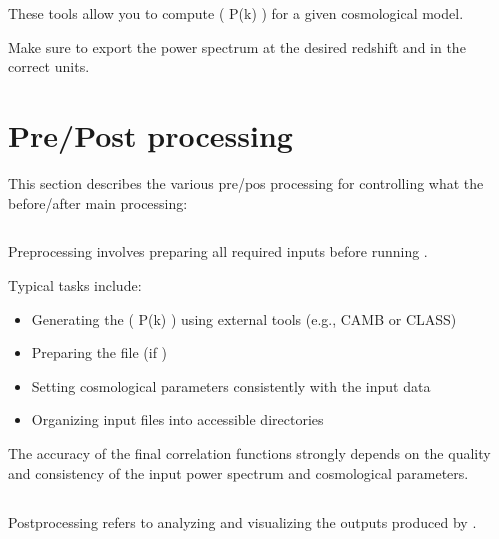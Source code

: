 \documentclass[letterpaper,10pt,english]{sphinxmanual}
\begin{document}
\sphinxAtStartPar
These tools allow you to compute ( P(k) ) for a given cosmological model.

\sphinxAtStartPar
Make sure to export the power spectrum at the desired redshift and in the correct units.

\sphinxstepscope


\chapter{Pre/Post processing}
\label{\detokenize{pre_post_process:pre-post-processing}}\label{\detokenize{pre_post_process::doc}}
\sphinxAtStartPar
This section describes the various pre/pos processing for controlling
what the  before/after main processing:


\section{}
\label{\detokenize{pre_post_process:pre-processing}}
\sphinxAtStartPar
Pre\sphinxhyphen{}processing involves preparing all required inputs before running .

\sphinxAtStartPar
Typical tasks include:
\begin{itemize}
\item {} 
\sphinxAtStartPar
Generating the  ( P(k) ) using external tools (e.g., CAMB or CLASS)

\item {} 
\sphinxAtStartPar
Preparing the  file (if )

\item {} 
\sphinxAtStartPar
Setting cosmological parameters consistently with the input data

\item {} 
\sphinxAtStartPar
Organizing input files into accessible directories

\end{itemize}

\sphinxAtStartPar
The accuracy of the final correlation functions strongly depends on the quality and consistency of the input power spectrum and cosmological parameters.


\section{}
\label{\detokenize{pre_post_process:post-processing}}
\sphinxAtStartPar
Post\sphinxhyphen{}processing refers to analyzing and visualizing the outputs produced by .
\end{document}
